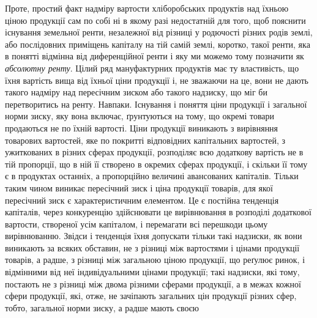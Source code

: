 Проте, простий факт надміру вартости хліборобських продуктів над їхньою ціною продукції сам по
собі ні в якому разі недостатній для того, щоб пояснити існування земельної ренти, незалежної від
різниці у родючості різних родів землі, або послідовних приміщень капіталу на тій самій землі,
коротко, такої ренти, яка в понятті відмінна від диференційної ренти і яку ми можемо тому позначити
як \emph{абсолютну ренту}. Цілий ряд мануфактурних продуктів має ту властивість, що їхня вартість вища від
їхньої ціни продукції і, не зважаючи на це, вони не дають такого надміру над пересічним зиском або
такого надзиску, що міг би перетворитись на ренту. Навпаки. Існування і поняття ціни продукції і
загальної норми зиску, яку вона включає, ґрунтуються на тому, що окремі товари продаються не по
їхній вартості. Ціни продукції виникають з вирівняння товарових вартостей, яке по покритті
відповідних капітальних вартостей, з ужиткованих в різних сферах продукції, розподіляє всю додаткову
вартість не в тій пропорції, що в ній її створено в окремих сферах продукції, і скільки її тому є в
продуктах останніх, а пропорційно величині авансованих капіталів. Тільки таким чином виникає
пересічний зиск і ціна продукції товарів, для якої пересічний зиск є характеристичним елементом. Це
є постійна тенденція капіталів, через конкуренцію здійснювати це вирівнювання в розподілі додаткової
вартости, створеної усім капіталом, і перемагати всі перешкоди цьому
вирівнюванню. Звідси і тенденція їхня допускати тільки такі надзиски, як вони виникають за всяких
обставин, не з різниці між вартостями і цінами продукції товарів, а радше, з різниці між загальною
ціною продукції, що реґулює ринок, і відмінними від неї індивідуальними цінами продукції; такі
надзиски, які тому, постають не з різниці між двома різними сферами продукції, а в межах кожної
сфери продукції, які, отже, не зачіпають загальних цін продукції різних сфер, тобто, загальної норми
зиску, а радше мають своєю
\parbreak{}  %
